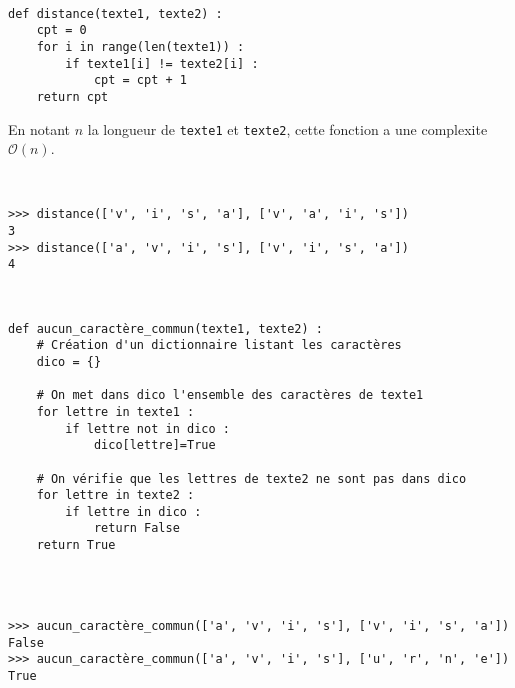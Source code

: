 \ifprof
\begin{corrige}~\\ 
\vspace{-.5cm}
\begin{lstlisting}
def distance(texte1, texte2) :
    cpt = 0
    for i in range(len(texte1)) : 
        if texte1[i] != texte2[i] :
            cpt = cpt + 1
    return cpt
\end{lstlisting}
En notant $n$ la longueur de \lstinline{texte1} et \lstinline{texte2}, cette fonction a une complexite $\mathcal{O}(n)$.
\end{corrige}
\else
\begin{exemple}~\\ 
\vspace{-.5cm}
\begin{lstlisting}
>>> distance(['v', 'i', 's', 'a'], ['v', 'a', 'i', 's'])
3
>>> distance(['a', 'v', 'i', 's'], ['v', 'i', 's', 'a'])
4
\end{lstlisting}
\end{exemple}
\fi



\ifprof
\begin{corrige}~\\ 
\vspace{-.5cm}
\begin{lstlisting}
def aucun_caractère_commun(texte1, texte2) :
    # Création d'un dictionnaire listant les caractères
    dico = {}

    # On met dans dico l'ensemble des caractères de texte1
    for lettre in texte1 : 
        if lettre not in dico : 
            dico[lettre]=True
    
    # On vérifie que les lettres de texte2 ne sont pas dans dico
    for lettre in texte2 : 
        if lettre in dico : 
            return False
    return True
            
\end{lstlisting}
\end{corrige}
\else
\begin{exemple}~\\ 
\vspace{-.5cm}
\begin{lstlisting}
>>> aucun_caractère_commun(['a', 'v', 'i', 's'], ['v', 'i', 's', 'a'])
False
>>> aucun_caractère_commun(['a', 'v', 'i', 's'], ['u', 'r', 'n', 'e'])
True
\end{lstlisting}
\end{exemple}
\fi




